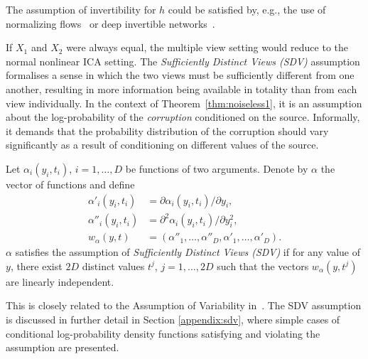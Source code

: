 The assumption of invertibility for $h$ could be satisfied by, e.g., the use of normalizing flows~\citep{rezende2015variational, chen2018neural} or deep invertible networks~\citep{jacobsen_hal-01712808}.


If $X_1$ and $X_2$ were always equal, the multiple view setting would reduce to the normal nonlinear ICA setting.
The \emph{Sufficiently Distinct Views (SDV)} assumption formalises a sense in which the two views must be sufficiently different from one another,
resulting in more information being available in totality than from each view individually.
In the context of Theorem~\ref{thm:noiseless1}, it is an assumption about the log-probability of the \emph{corruption} conditioned on the source.
Informally, it demands that the probability distribution of the corruption should vary significantly as a result of conditioning on different values of the source.

\medskip

\begin{definition}\label{suff_dist_assumption}
	Let $\alpha_i(y_i, t_i)$, $i=1,\ldots, D$ be functions of two arguments.
	Denote by $\alpha$ the vector of functions and define
	\begin{align}
	\alpha'_{i}(y_i, t_i)&= \partial \alpha_{i}(y_i, t_i)/\partial y_i, \label{eq:convention1}\\
	\alpha''_{i}(y_i, t_i)&=\partial^2 \alpha_{i}(y_i, t_i)/\partial y_i^2, \label{eq:convention2}\\
	{w}_{\alpha}({y}, {t}) &= (\alpha''_{1}, \ldots, \alpha''_{D}, \alpha'_{1}, \ldots,\alpha'_{D}).
	\end{align}
	${\alpha}$ satisfies the assumption of \emph{Sufficiently Distinct Views (SDV)} if for any value of ${y}$, there exist $2D$ distinct values ${t}^j$, $j=1, \ldots, 2D$ such that the vectors ${w_\alpha}({y},{t}^j)$ are linearly independent.
	\\    \end{definition}
This is closely related to the Assumption of Variability in~\cite{hyvarinen19a}.
The SDV assumption is discussed in further detail in Section \ref{appendix:sdv}, where simple cases of conditional log-probability density functions satisfying and violating the assumption are presented.



